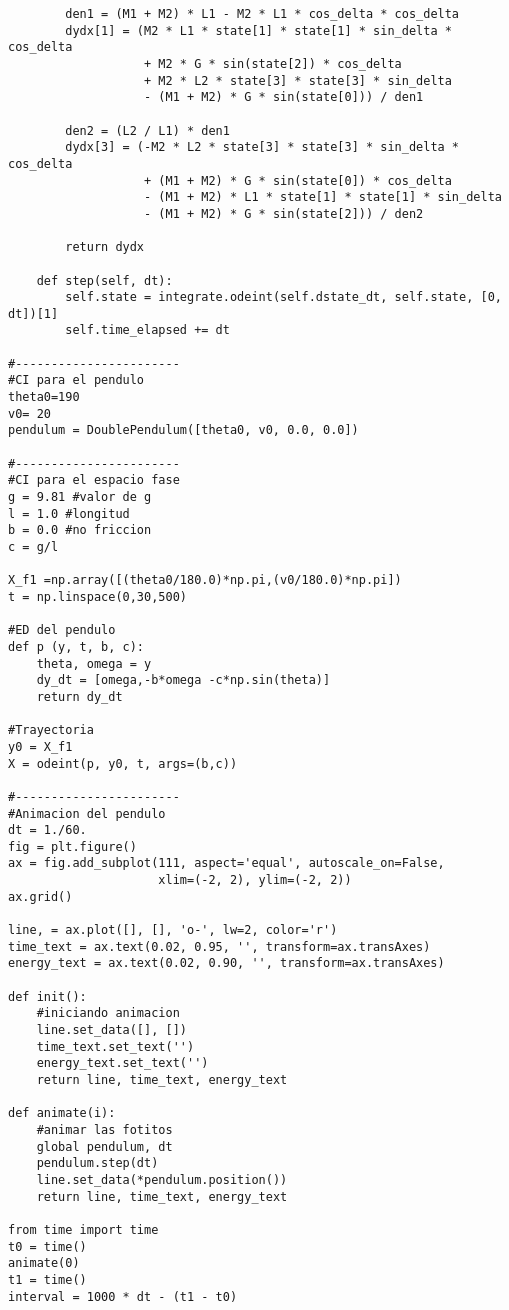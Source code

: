 \documentclass[a4paper]{article}
\begin{document}
\begin{verbatim}
        den1 = (M1 + M2) * L1 - M2 * L1 * cos_delta * cos_delta
        dydx[1] = (M2 * L1 * state[1] * state[1] * sin_delta * cos_delta
                   + M2 * G * sin(state[2]) * cos_delta
                   + M2 * L2 * state[3] * state[3] * sin_delta
                   - (M1 + M2) * G * sin(state[0])) / den1

        den2 = (L2 / L1) * den1
        dydx[3] = (-M2 * L2 * state[3] * state[3] * sin_delta * cos_delta
                   + (M1 + M2) * G * sin(state[0]) * cos_delta
                   - (M1 + M2) * L1 * state[1] * state[1] * sin_delta
                   - (M1 + M2) * G * sin(state[2])) / den2
        
        return dydx

    def step(self, dt):
        self.state = integrate.odeint(self.dstate_dt, self.state, [0, dt])[1]
        self.time_elapsed += dt

#-----------------------
#CI para el pendulo
theta0=190
v0= 20
pendulum = DoublePendulum([theta0, v0, 0.0, 0.0])

#-----------------------
#CI para el espacio fase
g = 9.81 #valor de g
l = 1.0 #longitud
b = 0.0 #no friccion
c = g/l

X_f1 =np.array([(theta0/180.0)*np.pi,(v0/180.0)*np.pi])
t = np.linspace(0,30,500)

#ED del pendulo
def p (y, t, b, c):
    theta, omega = y
    dy_dt = [omega,-b*omega -c*np.sin(theta)]
    return dy_dt

#Trayectoria
y0 = X_f1                       
X = odeint(p, y0, t, args=(b,c))         

#-----------------------
#Animacion del pendulo
dt = 1./60.
fig = plt.figure()
ax = fig.add_subplot(111, aspect='equal', autoscale_on=False,
                     xlim=(-2, 2), ylim=(-2, 2))
ax.grid()

line, = ax.plot([], [], 'o-', lw=2, color='r')
time_text = ax.text(0.02, 0.95, '', transform=ax.transAxes)
energy_text = ax.text(0.02, 0.90, '', transform=ax.transAxes)

def init():
    #iniciando animacion
    line.set_data([], [])
    time_text.set_text('')
    energy_text.set_text('')
    return line, time_text, energy_text

def animate(i):
    #animar las fotitos
    global pendulum, dt
    pendulum.step(dt)
    line.set_data(*pendulum.position())
    return line, time_text, energy_text

from time import time
t0 = time()
animate(0)
t1 = time()
interval = 1000 * dt - (t1 - t0)


\end{verbatim}
\end{document}
